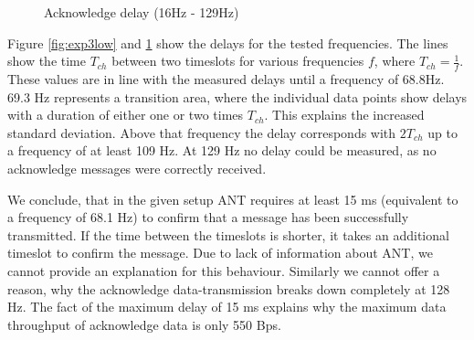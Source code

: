 \begin{description}
\begin{figure}[H]
		\caption{Acknowledge delay (16Hz - 129Hz)}\label{fig:exp3high}
	\end{figure}
	Figure \ref{fig:exp3low} and \ref{fig:exp3high} show the delays for the tested frequencies. The lines show the time $T_{ch}$ between two timeslots for various frequencies $f$, where $T_{ch} = \frac{1}{f}$. These values are in line with the measured delays until a frequency of 68.8Hz. 69.3 Hz represents a transition area, where the individual data points show delays with a duration of either one or two times $T_{ch}$. This explains the increased standard deviation. Above that frequency the delay corresponds with $2T_{ch}$ up to a frequency of at least 109 Hz. At 129 Hz no delay could be measured, as no acknowledge messages were correctly received. 

	We conclude, that in the given setup ANT requires at least 15 ms (equivalent to a frequency of 68.1 Hz) to confirm that a message has been successfully transmitted. If the time between the timeslots is shorter, it takes an additional timeslot to confirm the message. Due to lack of information about ANT, we cannot provide an explanation for this behaviour. Similarly we cannot offer a reason, why the acknowledge data-transmission breaks down completely at 128 Hz. The fact of the maximum delay of 15 ms explains why the maximum data throughput of acknowledge data is only 550 Bps.

\end{description}
\newpage

